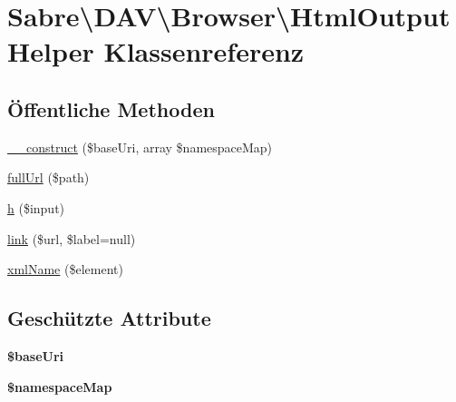 \hypertarget{class_sabre_1_1_d_a_v_1_1_browser_1_1_html_output_helper}{}\section{Sabre\textbackslash{}D\+AV\textbackslash{}Browser\textbackslash{}Html\+Output\+Helper Klassenreferenz}
\label{class_sabre_1_1_d_a_v_1_1_browser_1_1_html_output_helper}
\subsection*{Öffentliche Methoden}
\begin{DoxyCompactItemize}
\item 
\mbox{\hyperlink{class_sabre_1_1_d_a_v_1_1_browser_1_1_html_output_helper_a7c5605a84a03a7c8eaa945d9398b7696}{\+\_\+\+\_\+construct}} (\$base\+Uri, array \$namespace\+Map)
\item 
\mbox{\hyperlink{class_sabre_1_1_d_a_v_1_1_browser_1_1_html_output_helper_a0df2f5d6299fb36871fcfb1115d89a65}{full\+Url}} (\$path)
\item 
\mbox{\hyperlink{class_sabre_1_1_d_a_v_1_1_browser_1_1_html_output_helper_a21d932e333bf803f466092a80f2d101b}{h}} (\$input)
\item 
\mbox{\hyperlink{class_sabre_1_1_d_a_v_1_1_browser_1_1_html_output_helper_ada89e16f2f3b82c3ffa2dd37b9408be2}{link}} (\$url, \$label=null)
\item 
\mbox{\hyperlink{class_sabre_1_1_d_a_v_1_1_browser_1_1_html_output_helper_af4773ae31fecd86e59f7302ee5fcd160}{xml\+Name}} (\$element)
\end{DoxyCompactItemize}
\subsection*{Geschützte Attribute}
\begin{DoxyCompactItemize}
\item 
\mbox{\label{class_sabre_1_1_d_a_v_1_1_browser_1_1_html_output_helper_acd8589729053db7d63762b8fd6d575d9}} 
{\bfseries \$base\+Uri}
\item 
\mbox{\label{class_sabre_1_1_d_a_v_1_1_browser_1_1_html_output_helper_abf8dcf612c7b60ea2b720a08a0cbcf23}} 
{\bfseries \$namespace\+Map}
\end{DoxyCompactItemize}


